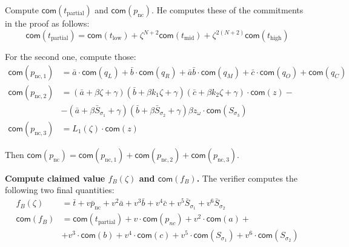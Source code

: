\documentclass[../../book.tex]{subfiles}
\begin{document}
Compute $\mathsf{com}(t_{\text{partial}})$ and
$\mathsf{com}(p_{\text{nc}})$. He computes these of the commitments in the
proof as follows:
\begin{equation*}
    \mathsf{com}(t_{\text{partial}}) = \mathsf{com}(t_{\text{low}}) + \zeta^{N+2}\mathsf{com}(t_{\text{mid}}) + \zeta^{2(N+2)}\mathsf{com}(t_{\text{high}})
\end{equation*}

For the second one, compute those:
\begin{equation*}
    \begin{aligned}
        \mathsf{com}(p_{\text{nc},1}) &= \bar{a}\cdot\mathsf{com}(q_L) + \bar{b} \cdot \mathsf{com}(q_R) + \bar{a}\bar{b} \cdot \mathsf{com}(q_M) + \bar{c} \cdot \mathsf{com}(q_O) + \mathsf{com}(q_C) \\
        \mathsf{com}(p_{\text{nc},2}) &= (\bar{a} + \beta \zeta + \gamma)(\bar{b} + \beta k_1 \zeta + \gamma)(\bar{c} + \beta k_2 \zeta + \gamma) \cdot\mathsf{com}(z) - \\ 
                                      &- (\bar{a} + \beta \bar{S}_{\sigma_1} + \gamma)(\bar{b} + \beta \bar{S}_{\sigma_2} + \gamma)\beta z_{\omega}\cdot \mathsf{com}(S_{\sigma_3}) \\
        \mathsf{com}(p_{\text{nc},3}) &= L_1(\zeta)\cdot\mathsf{com}(z)
    \end{aligned}
\end{equation*}

Then $\mathsf{com}(p_{\text{nc}}) = \mathsf{com}(p_{\text{nc},1}) + \mathsf{com}(p_{\text{nc},2}) + \mathsf{com}(p_{\text{nc},3})$.

\textcolor{blue!60!black}{\textbf{Compute claimed value $f_{B}(\zeta)$ and $\mathsf{com}(f_{B})$.}} The verifier computes 
the following two final quantities:
\begin{align*}
f_{B}(\zeta) &= \bar{t} + v \bar{p}_{\text{nc}} + v^2 \bar{a} + v^3 \bar{b} + v^4 \bar{c} + v^5 \bar{S}_{\sigma_1} + v^6 \bar{S}_{\sigma_2} \\
\mathsf{com}(f_{B}) &= \mathsf{com}(t_{\text{partial}}) + v \cdot \mathsf{com}(p_{nc}) + v^2 \cdot \mathsf{com}(a) + \\
&+ v^3 \cdot \mathsf{com}(b) + v^4 \cdot \mathsf{com}(c) + v^5 \cdot \mathsf{com}(S_{\sigma_1}) + v^6 \cdot \mathsf{com}(S_{\sigma_2})
\end{align*}
\end{document}
